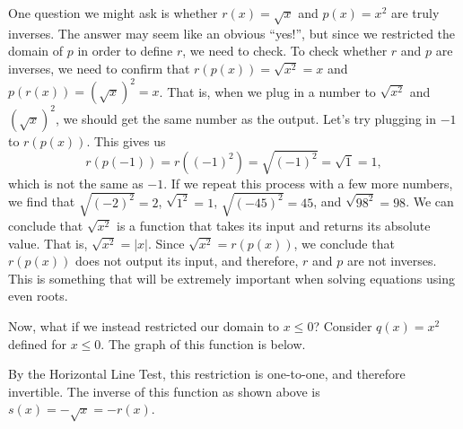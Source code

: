 \documentclass{ximera}
\begin{document}
One question we might ask is whether $r(x) = \sqrt{x}$ and $p(x) = x^2$ are truly inverses. The answer may seem like an obvious ``yes!'', but since we restricted the domain of $p$ in order to define $r$, we need to check. To check whether $r$ and $p$ are inverses, we need to confirm that $r(p(x)) = \sqrt{x^2} = x$ and $p(r(x)) = (\sqrt{x})^2 = x$. That is, when we plug in a number to $\sqrt{x^2}$ and $(\sqrt{x})^2$, we should get the same number as the output. Let's try plugging in $-1$ to $r(p(x))$. This gives us 
$$
r(p(-1)) = r((-1)^2) = \sqrt{(-1)^2} = \sqrt{1} = 1,
$$
which is not the same as $-1$. If we repeat this process with a few more numbers, we find that $\sqrt{(-2)^2} = 2$, $\sqrt{1^2} = 1$, $\sqrt{(-45)^2} = 45$, and $\sqrt{98^2} = 98$. We can conclude that $\sqrt{x^2}$ is a function that takes its input and returns its absolute value. That is, $\sqrt{x^2} = |x|$. Since $\sqrt{x^2} = r(p(x))$, we conclude that $r(p(x))$ does not output its input, and therefore, $r$ and $p$ are not inverses. This is something that will be extremely important when solving equations using even roots. 

Now, what if we instead restricted our domain to $x \leq 0$? Consider $q(x) = x^2$ defined for $x \leq 0$. The graph of this function is below.

\begin{image}
\end{image}
By the Horizontal Line Test, this restriction is one-to-one, and therefore invertible. The inverse of this function as shown above is $s(x) = -\sqrt{x} = -r(x)$.
\end{document}
